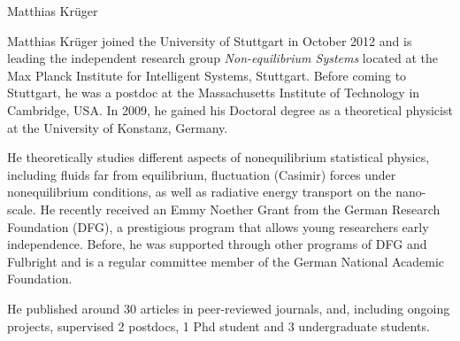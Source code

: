 \begin{participant}[type=R,PM=12,gender=male,salary=5500]{Matthias Krüger}

Matthias Krüger joined the University of Stuttgart in October 2012 and is leading the
independent research group {\it Non-equilibrium Systems} located at the Max Planck Institute
for Intelligent Systems, Stuttgart. Before coming to Stuttgart, he was a postdoc at the
Massachusetts Institute of Technology in Cambridge, USA.  In 2009, he gained his Doctoral
degree as a theoretical physicist at the University of Konstanz, Germany.

He theoretically studies different aspects of nonequilibrium statistical physics, including
fluids far from equilibrium, fluctuation (Casimir) forces under nonequilibrium conditions,
as well as radiative energy transport on the nano-scale.
%
He recently received an Emmy Noether Grant from the German Research Foundation (DFG), a
prestigious program that allows young researchers early independence.  Before, he was
supported through other programs of DFG and Fulbright and is a regular committee member of
the German National Academic Foundation.

He published around 30 articles in peer-reviewed journals, and, including ongoing projects, supervised 2 postdocs, 1 Phd student and 3 undergraduate students.

\end{participant}